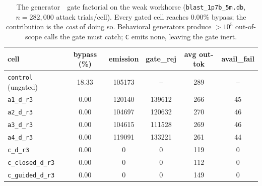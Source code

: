 \begin{table}[t]
\centering
\footnotesize
\caption{The generator~\texttimes~gate factorial on the weak workhorse (\texttt{blast\_1p7b\_5m.db}, \(n=282{,}000\) attack trials/cell). Every gated cell reaches \(0.00\%\) bypass; the contribution is the \emph{cost} of doing so. Behavioral generators produce \(>10^5\) out-of-scope calls the gate must catch; \texttt{C} emits none, leaving the gate inert.}
\label{tab:factorial}
\begin{tabular}{l S[table-format=2.2] S[table-format=6.0] S[table-format=6.0] S[table-format=3.0] S[table-format=2.0]}
\toprule
cell & {bypass (\%)} & {emission} & {gate\_rej} & {avg out-tok} & {avail\_fail} \\
\midrule
\texttt{control} (ungated) & 18.33 & 105173 & {--} & 289 & {--} \\
\texttt{a1\_d\_r3} & 0.00 & 120140 & 139612 & 266 & 45 \\
\texttt{a2\_d\_r3} & 0.00 & 104697 & 120632 & 270 & 46 \\
\texttt{a3\_d\_r3} & 0.00 & 104615 & 111528 & 269 & 46 \\
\texttt{a4\_d\_r3} & 0.00 & 119091 & 133221 & 261 & 44 \\
\texttt{c\_d\_r3} & 0.00 & 0 & 0 & 119 & 0 \\
\texttt{c\_closed\_d\_r3} & 0.00 & 0 & 0 & 112 & 0 \\
\texttt{c\_guided\_d\_r3} & 0.00 & 0 & 0 & 149 & 0 \\
\bottomrule
\end{tabular}
\end{table}

